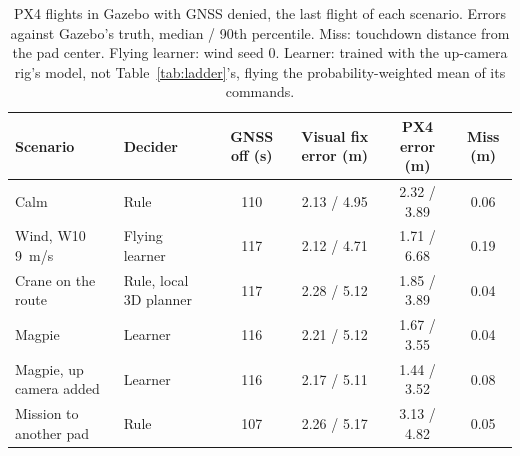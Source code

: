 \begin{table}[t]
\centering\small
\setlength{\tabcolsep}{5pt}
\caption{PX4 flights in Gazebo with GNSS denied, the last flight of each scenario. Errors against Gazebo's truth, median / 90th percentile. Miss: touchdown distance from the pad center. Flying learner: wind seed 0. Learner: trained with the up-camera rig's model, not Table~\ref{tab:ladder}'s, flying the probability-weighted mean of its commands.}
\label{tab:gnssfree}
\begin{tabular}{llcccc}
\toprule
Scenario & Decider & GNSS off (s) & Visual fix error (m) & PX4 error (m) & Miss (m) \\
\midrule
Calm & Rule & 110 & 2.13 / 4.95 & 2.32 / 3.89 & 0.06 \\
Wind, W10 9~m/s & Flying learner & 117 & 2.12 / 4.71 & 1.71 / 6.68 & 0.19 \\
Crane on the route & Rule, local 3D planner & 117 & 2.28 / 5.12 & 1.85 / 3.89 & 0.04 \\
Magpie & Learner & 116 & 2.21 / 5.12 & 1.67 / 3.55 & 0.04 \\
Magpie, up camera added & Learner & 116 & 2.17 / 5.11 & 1.44 / 3.52 & 0.08 \\
Mission to another pad & Rule & 107 & 2.26 / 5.17 & 3.13 / 4.82 & 0.05 \\
\bottomrule
\end{tabular}
\end{table}
